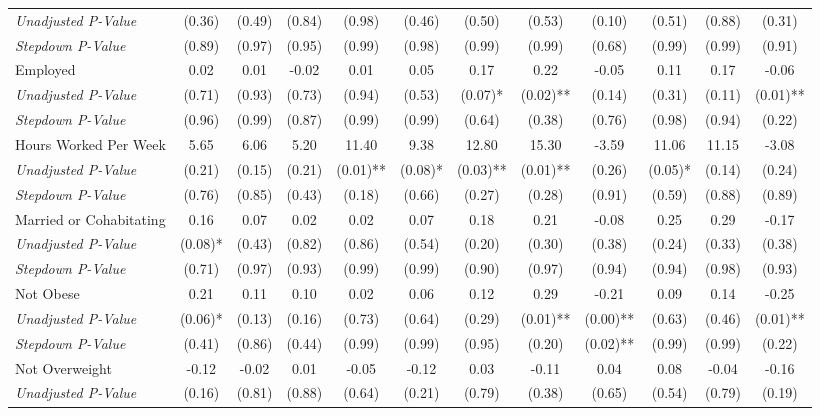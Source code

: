 \begin{tabular}{l c c c c c c c c c c c}
\quad \textit{Unadjusted P-Value} & (0.36) & (0.49) & (0.84) & (0.98) & (0.46) & (0.50) & (0.53) & (0.10) & (0.51) & (0.88) & (0.31) \\
\quad \textit{Stepdown P-Value} & (0.89) & (0.97) & (0.95) & (0.99) & (0.98) & (0.99) & (0.99) & (0.68) & (0.99) & (0.99) & (0.91) \\
Employed & 0.02 & 0.01 & -0.02 & 0.01 & 0.05 & 0.17 & 0.22 & -0.05 & 0.11 & 0.17 & -0.06 \\
\quad \textit{Unadjusted P-Value} & (0.71) & (0.93) & (0.73) & (0.94) & (0.53) & (0.07)* & (0.02)** & (0.14) & (0.31) & (0.11) & (0.01)** \\
\quad \textit{Stepdown P-Value} & (0.96) & (0.99) & (0.87) & (0.99) & (0.99) & (0.64) & (0.38) & (0.76) & (0.98) & (0.94) & (0.22) \\
Hours Worked Per Week & 5.65 & 6.06 & 5.20 & 11.40 & 9.38 & 12.80 & 15.30 & -3.59 & 11.06 & 11.15 & -3.08 \\
\quad \textit{Unadjusted P-Value} & (0.21) & (0.15) & (0.21) & (0.01)** & (0.08)* & (0.03)** & (0.01)** & (0.26) & (0.05)* & (0.14) & (0.24) \\
\quad \textit{Stepdown P-Value} & (0.76) & (0.85) & (0.43) & (0.18) & (0.66) & (0.27) & (0.28) & (0.91) & (0.59) & (0.88) & (0.89) \\
Married or Cohabitating & 0.16 & 0.07 & 0.02 & 0.02 & 0.07 & 0.18 & 0.21 & -0.08 & 0.25 & 0.29 & -0.17 \\
\quad \textit{Unadjusted P-Value} & (0.08)* & (0.43) & (0.82) & (0.86) & (0.54) & (0.20) & (0.30) & (0.38) & (0.24) & (0.33) & (0.38) \\
\quad \textit{Stepdown P-Value} & (0.71) & (0.97) & (0.93) & (0.99) & (0.99) & (0.90) & (0.97) & (0.94) & (0.94) & (0.98) & (0.93) \\
Not Obese & 0.21 & 0.11 & 0.10 & 0.02 & 0.06 & 0.12 & 0.29 & -0.21 & 0.09 & 0.14 & -0.25 \\
\quad \textit{Unadjusted P-Value} & (0.06)* & (0.13) & (0.16) & (0.73) & (0.64) & (0.29) & (0.01)** & (0.00)** & (0.63) & (0.46) & (0.01)** \\
\quad \textit{Stepdown P-Value} & (0.41) & (0.86) & (0.44) & (0.99) & (0.99) & (0.95) & (0.20) & (0.02)** & (0.99) & (0.99) & (0.22) \\
Not Overweight & -0.12 & -0.02 & 0.01 & -0.05 & -0.12 & 0.03 & -0.11 & 0.04 & 0.08 & -0.04 & -0.16 \\
\quad \textit{Unadjusted P-Value} & (0.16) & (0.81) & (0.88) & (0.64) & (0.21) & (0.79) & (0.38) & (0.65) & (0.54) & (0.79) & (0.19) \\

\end{tabular}
